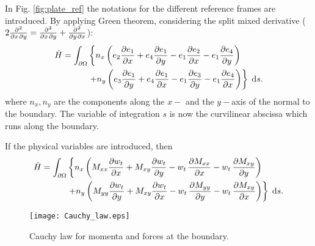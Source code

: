 \documentclass[11pt]{article}
\begin{document}
	In Fig. \ref{fig:plate_ref} the notations for the different reference frames are introduced. By applying Green theorem, considering the split mixed derivative ($2 \diffp{}{x,y} = \diffp{}{x,y} +  \diffp{}{y,x}$):
	\begin{align}
	\dot{H} = \int_{\partial \Omega}  & \left\{  n_x \left(e_2 \diffp{e_1}{x}  + e_4 \diffp{e_1}{y}  - e_1 \diffp{e_2}{x} - e_1 \diffp{e_4}{y}\right)
	\right. \nonumber \\
	&   \left. +n_y \left(e_3 \diffp{e_1}{y} + e_4 \diffp{e_1}{x} - e_1 \diffp{e_3}{y} - e_1 \diffp{e_4}{x} \right) \right\} \d{s}.
	\end{align}
	where $n_x, n_y$ are the components along the $x-$ and the $y-$axis of the normal to the boundary. The variable of integration $s$ is now the curvilinear abscissa which runs along the boundary. 
	
	
	If the physical variables are introduced, then  
	\begin{align}
	\dot{H} = \int_{\partial \Omega}  & \left\{  n_x \left(M_{xx} \diffp{w_t}{x} + M_{xy} \diffp{w_t}{y} - w_t \, \diffp{M_{xx} }{x}   - w_t \, \diffp{M_{xy}}{y}\right)
	\right.  \nonumber\\
	&  \left. +n_y \left(M_{yy} \diffp{w_t}{y} + M_{xy} \diffp{w_t}{x} - w_t \, \diffp{M_{yy}}{y} - w_t\, \diffp{M_{xy}}{x} \right) \right\} \d{s}.
	\end{align}
	
	\begin{figure}
		\centering
		\texttt{[image: Cauchy\_law.eps]}
		\caption{Cauchy law for momenta and forces at the boundary.}
		\label{fig:Cauchy_law}
	\end{figure}
	
\end{document}

